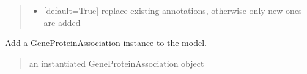 \documentclass[letterpaper,12pt,english]{sphinxmanual}
\begin{document}
\begin{fulllineitems}
\begin{fulllineitems}
\begin{quote}
\begin{description}
\begin{itemize}
\item {} 
\sphinxAtStartPar
{} \textendash{} {[}default=True{]} replace existing annotations, otherwise only new ones are added

\end{itemize}

\end{description}\end{quote}

\end{fulllineitems}


\begin{fulllineitems}
\label{\detokenize{api/core:cbmpy.CBModel.Model.addGPRAssociation}}
\pysigstartsignatures
\pysiglinewithargsret
{}
{\sphinxparamcomma {}}
{}
\pysigstopsignatures
\sphinxAtStartPar
Add a GeneProteinAssociation instance to the model.
\begin{quote}\begin{description}
\sphinxAtStartPar
{} \textendash{} an instantiated GeneProteinAssociation object

\end{description}\end{quote}

\end{fulllineitems}



\end{fulllineitems}
\end{document}
